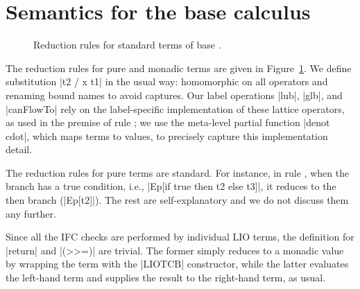 \appendices
\section{Semantics for the base calculus}
\label{sec:app:sem}

\begin{figure} %
\small
{}
\caption{Reduction rules for standard terms of base \lio.\label{fig:sos:rules}}
\end{figure}


The reduction rules for pure and monadic terms are given in
Figure~\ref{fig:sos:rules}. 
% 
We define substitution |{t2 / x } t1| in the
usual way: homomorphic on all operators and renaming bound names to avoid
captures.
%
Our label operations |lub|, |glb|, and |canFlowTo| rely on the label-specific
implementation of these lattice operators, as used in the premise of rule
; we use the meta-level partial function |denot cdot|, which
maps terms to values, to precisely capture this implementation detail.

%
The reduction rules for pure terms are standard. For instance, in rule
, when the branch has a true condition, i.e., |Ep[if
true then t2 else t3]|, it reduces to the then branch (|Ep[t2]|).  The
rest are self-explanatory and we do not discuss them any further. 
%

%
%
Since all the IFC checks are performed by individual LIO terms, the
definition for |return| and |(>>=)| are trivial.
The former simply reduces to a monadic value by wrapping the term with
the |LIOTCB| constructor, while the latter evaluates the left-hand
term and supplies the result to the right-hand term, as usual.


